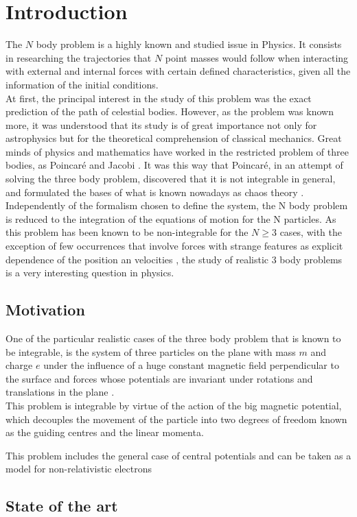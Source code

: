\chapter{Introduction}
The $N$ body problem is a highly known and studied issue in Physics. It consists in researching the trajectories that $N$ point masses would follow when interacting with external and internal forces with certain defined characteristics, given all the information of the initial conditions.\\

At first, the principal interest in the study of this problem was the exact prediction of the path of celestial bodies. However, as the problem was known more, it was understood that its study is of great importance not only for astrophysics but for the theoretical comprehension of classical mechanics. Great minds of physics and mathematics have worked in the restricted problem of three bodies, as Poincar\'e \cite{introPoincare} and Jacobi \cite{introJacobi}. It was this way that Poincar\'e, in an attempt of solving the three body problem, discovered that it is not integrable in general, and formulated the bases of what is known nowadays as chaos theory \cite{introPoincare}.\\

Independently of the formalism chosen to define the system, the N body problem is reduced to the integration of the equations of motion for the N particles. As this problem has been known to be non-integrable for the $N\geq 3$ cases, with the exception of few occurrences that involve forces with strange features as explicit dependence of the position an velocities \cite{strangeCases}, the study of realistic 3 body problems is a very interesting question in physics.\\

\section{Motivation}
One of the particular realistic cases of the three body problem that is known to be integrable, is the system of three particles on the plane with mass $m$ and charge $e$ under the influence of a huge constant magnetic field perpendicular to the surface and forces whose potentials are invariant under rotations and translations in the plane \cite{alonso}.\\

This problem is integrable by virtue of the action of the big magnetic potential, which decouples the movement of  the particle into two degrees of freedom known as the guiding centres and the linear momenta. 

This problem includes the general case of central potentials and can be taken as a model for non-relativistic electrons

\section{State of the art}
